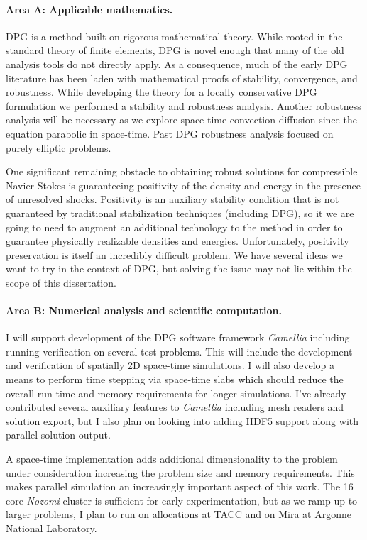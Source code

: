 \documentclass[Proposal.tex]{subfiles}
\begin{document}
\paragraph{Area A: Applicable mathematics.}
DPG is a method built on rigorous mathematical theory.
While rooted in the standard theory of finite elements, DPG is novel enough that many of the old analysis tools do not directly apply.
As a consequence, much of the early DPG literature has been laden with mathematical proofs of stability, convergence, and robustness.
While developing the theory for a locally conservative DPG formulation we performed a stability and robustness analysis.
Another robustness analysis will be necessary as we explore space-time convection-diffusion since the equation parabolic in space-time.
Past DPG robustness analysis focused on purely elliptic problems.

One significant remaining obstacle to obtaining robust solutions for compressible Navier-Stokes is guaranteeing positivity of the density and
energy in the presence of unresolved shocks. 
Positivity is an auxiliary stability condition that is not guaranteed by traditional stabilization 
techniques (including DPG), so it we are going to need to augment an additional technology to the method in order to guarantee physically
realizable densities and energies. 
Unfortunately, positivity preservation is itself an incredibly difficult problem. 
We have several ideas we want to try in the context of DPG, but solving the issue may not lie within the scope of this dissertation.

\paragraph{Area B: Numerical analysis and scientific computation.}
I will support development of the DPG software framework \emph{Camellia}\cite{Roberts2011} including running verification on several test problems.
This will include the development and verification of spatially 2D space-time simulations.
I will also develop a means to perform time stepping via space-time slabs which should reduce the 
overall run time and memory requirements for longer simulations.
I've already contributed several auxiliary features to \emph{Camellia} including mesh readers and solution export, 
but I also plan on looking into adding HDF5 support along with parallel solution output.

A space-time implementation adds additional dimensionality to the problem under consideration increasing the problem size and memory requirements.
This makes parallel simulation an increasingly important aspect of this work.
The 16 core \emph{Nozomi} cluster is sufficient for early experimentation, but as we ramp up to larger problems, I plan to run on allocations at TACC and on Mira at Argonne National Laboratory.
\end{document}
